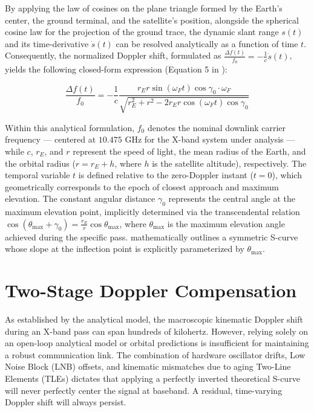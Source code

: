By applying the law of cosines on the plane triangle formed by the Earth's center, the ground terminal, and the satellite's position, alongside the spherical cosine law for the projection of the ground trace, the dynamic slant range $s(t)$ and its time-derivative $\dot{s}(t)$ can be resolved analytically as a function of time $t$. Consequently, the normalized Doppler shift, formulated as $\frac{\Delta f(t)}{f_0} = -\frac{1}{c}\dot{s}(t)$, yields the following closed-form expression (Equation 5 in \autocite{ali1998doppler}):

\begin{equation}
\label{eq:doppler_model}
\frac{\Delta f(t)}{f_0} = -\frac{1}{c} \frac{r_{E}r \sin(\omega_{F} t) \cos \gamma_0 \cdot \omega_{F}}{\sqrt{r_{E}^{2}+r^{2}-2r_{E}r \cos(\omega_{F} t) \cos \gamma_0}}
\end{equation}

Within this analytical formulation, $f_0$ denotes the nominal downlink carrier frequency --- centered at $10.475$ GHz for the X-band system under analysis --- while $c$, $r_{E}$, and $r$ represent the speed of light, the mean radius of the Earth, and the orbital radius ($r = r_{E} + h$, where $h$ is the satellite altitude), respectively. The temporal variable $t$ is defined relative to the zero-Doppler instant ($t = 0$), which geometrically corresponds to the epoch of closest approach and maximum elevation. The constant angular distance $\gamma_0$ represents the central angle at the maximum elevation point, implicitly determined via the transcendental relation $\cos(\theta_{\max} + \gamma_0) = \frac{r_{E}}{r} \cos \theta_{\max}$, where $\theta_{\max}$ is the maximum elevation angle achieved during the specific pass.  mathematically outlines a symmetric S-curve whose slope at the inflection point is explicitly parameterized by $\theta_{\max}$.


\section{Two-Stage Doppler Compensation} \label{sec:doppler_comp}

As established by the analytical model, the macroscopic kinematic Doppler shift during an X-band pass can span hundreds of kilohertz. However, relying solely on an open-loop analytical model or orbital predictions is insufficient for maintaining a robust communication link. The combination of hardware oscillator drifts, Low Noise Block (LNB) offsets, and kinematic mismatches due to aging Two-Line Elements (TLEs) dictates that applying a perfectly inverted theoretical S-curve will never perfectly center the signal at baseband. A residual, time-varying Doppler shift will always persist.

